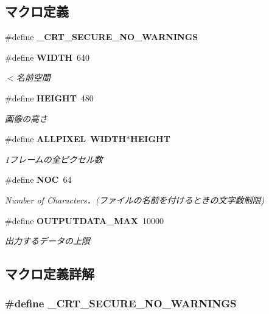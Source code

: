 \subsection*{マクロ定義}
\begin{DoxyCompactItemize}
\item 
\#define {\bf \-\_\-\-C\-R\-T\-\_\-\-S\-E\-C\-U\-R\-E\-\_\-\-N\-O\-\_\-\-W\-A\-R\-N\-I\-N\-G\-S}
\item 
\#define {\bf W\-I\-D\-T\-H}~640
\begin{DoxyCompactList}\small\item\em $<$名前空間 \end{DoxyCompactList}\item 
\#define {\bf H\-E\-I\-G\-H\-T}~480
\begin{DoxyCompactList}\small\item\em 画像の高さ \end{DoxyCompactList}\item 
\#define {\bf A\-L\-L\-P\-I\-X\-E\-L}~{\bf W\-I\-D\-T\-H}$\ast${\bf H\-E\-I\-G\-H\-T}
\begin{DoxyCompactList}\small\item\em 1フレームの全ピクセル数 \end{DoxyCompactList}\item 
\#define {\bf N\-O\-C}~64
\begin{DoxyCompactList}\small\item\em Number of Characters．(ファイルの名前を付けるときの文字数制限) \end{DoxyCompactList}\item 
\#define {\bf O\-U\-T\-P\-U\-T\-D\-A\-T\-A\-\_\-\-M\-A\-X}~10000
\begin{DoxyCompactList}\small\item\em 出力するデータの上限 \end{DoxyCompactList}\end{DoxyCompactItemize}


\subsection{マクロ定義詳解}
\subsubsection[{\-\_\-\-C\-R\-T\-\_\-\-S\-E\-C\-U\-R\-E\-\_\-\-N\-O\-\_\-\-W\-A\-R\-N\-I\-N\-G\-S}]{\setlength{\rightskip}{0pt plus 5cm}\#define \-\_\-\-C\-R\-T\-\_\-\-S\-E\-C\-U\-R\-E\-\_\-\-N\-O\-\_\-\-W\-A\-R\-N\-I\-N\-G\-S}\label{stdafx_8h_af08ec37a8c99d747fb60fa15bc28678b}


